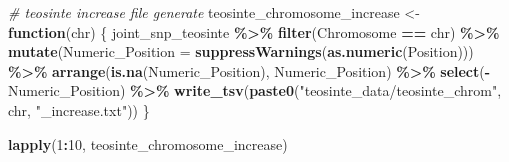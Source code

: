 \documentclass[
]{article}
\newenvironment{Shaded}{\begin{snugshade}}{\end{snugshade}}
\newcommand{\AttributeTok}[1]{\textcolor[rgb]{0.13,0.29,0.53}{#1}}
\newcommand{\CommentTok}[1]{\textcolor[rgb]{0.56,0.35,0.01}{\textit{#1}}}
\newcommand{\ControlFlowTok}[1]{\textcolor[rgb]{0.13,0.29,0.53}{\textbf{#1}}}
\newcommand{\DecValTok}[1]{\textcolor[rgb]{0.00,0.00,0.81}{#1}}
\newcommand{\FunctionTok}[1]{\textcolor[rgb]{0.13,0.29,0.53}{\textbf{#1}}}
\newcommand{\NormalTok}[1]{#1}
\newcommand{\OtherTok}[1]{\textcolor[rgb]{0.56,0.35,0.01}{#1}}
\newcommand{\SpecialCharTok}[1]{\textcolor[rgb]{0.81,0.36,0.00}{\textbf{#1}}}
\newcommand{\StringTok}[1]{\textcolor[rgb]{0.31,0.60,0.02}{#1}}
\begin{document}
\begin{Shaded}
\begin{Highlighting}[]
\CommentTok{\# teosinte increase file generate}
\NormalTok{teosinte\_chromosome\_increase }\OtherTok{\textless{}{-}} \ControlFlowTok{function}\NormalTok{(chr) \{}
\NormalTok{  joint\_snp\_teosinte }\SpecialCharTok{\%\textgreater{}\%}
    \FunctionTok{filter}\NormalTok{(Chromosome }\SpecialCharTok{==}\NormalTok{ chr) }\SpecialCharTok{\%\textgreater{}\%}
    \FunctionTok{mutate}\NormalTok{(}\AttributeTok{Numeric\_Position =} \FunctionTok{suppressWarnings}\NormalTok{(}\FunctionTok{as.numeric}\NormalTok{(Position))) }\SpecialCharTok{\%\textgreater{}\%}
    \FunctionTok{arrange}\NormalTok{(}\FunctionTok{is.na}\NormalTok{(Numeric\_Position), Numeric\_Position) }\SpecialCharTok{\%\textgreater{}\%}
    \FunctionTok{select}\NormalTok{(}\SpecialCharTok{{-}}\NormalTok{Numeric\_Position) }\SpecialCharTok{\%\textgreater{}\%}
    \FunctionTok{write\_tsv}\NormalTok{(}\FunctionTok{paste0}\NormalTok{(}\StringTok{"teosinte\_data/teosinte\_chrom"}\NormalTok{, chr, }\StringTok{"\_increase.txt"}\NormalTok{))}
\NormalTok{\}}

\FunctionTok{lapply}\NormalTok{(}\DecValTok{1}\SpecialCharTok{:}\DecValTok{10}\NormalTok{, teosinte\_chromosome\_increase)}
\end{Highlighting}
\end{Shaded}
\end{document}
